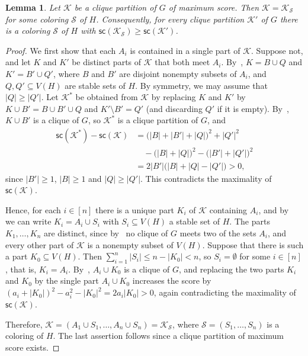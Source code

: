 \documentclass[a4paper,fleqn]{cas-sc}
\newtheorem{lem}[thm]{Lemma}
\theoremstyle{remark}
\theoremstyle{plain}
\newcommand{\score}{{\mathsf{sc}}}
\begin{document}
\begin{lem} \label{lem:structure}
    Let $\mathcal{K}$ be a clique partition of $G$ of maximum score.  Then $\mathcal{K}=\mathcal{K}_{\mathcal{S}}$ for some coloring $\mathcal{S}$ of $H$.  Consequently, for every clique partition $\mathcal{K}'$ of $G$ there is a coloring $\mathcal{S}$ of $H$ with $\score(\mathcal{K}_{\mathcal{S}}) \geq \score(\mathcal{K}')$.
\end{lem}

\begin{proof}
    We first show that each $A_i$ is contained in a single part of $\mathcal{K}$.  Suppose not, and let $K$ and $K'$ be distinct parts of $\mathcal{K}$ that both meet $A_i$.  By~, $K = B \cup Q$ and $K'=B' \cup Q'$, where $B$ and $B'$ are disjoint nonempty subsets of $A_i$, and $Q, Q' \subseteq V(H)$ are stable sets of $H$.  By symmetry, we may assume that $|Q| \geq |Q'|$.  Let $\mathcal{K}^*$ be obtained from $\mathcal{K}$ by replacing $K$ and $K'$ by $K \cup B' = B \cup B' \cup Q$ and $K' \setminus B' = Q'$ (and discarding $Q'$ if it is empty).  By~, $K \cup B'$ is a clique of $G$, so $\mathcal{K}^*$ is a clique partition of $G$, and
    \begin{align*}
        \score(\mathcal{K}^*) - \score(\mathcal{K})
        &= \bigl(|B|+|B'|+|Q|\bigr)^2 + |Q'|^2 \\
        &\quad - \bigl(|B|+|Q|\bigr)^2 - \bigl(|B'|+|Q'|\bigr)^2 \\
        &= 2|B'|\bigl(|B| + |Q| - |Q'|\bigr) > 0,
    \end{align*}
    since $|B'| \geq 1$, $|B| \geq 1$ and $|Q| \geq |Q'|$.  This contradicts the maximality of $\score(\mathcal{K})$.

    Hence, for each $i \in [n]$ there is a unique part $K_i$ of $\mathcal{K}$ containing $A_i$, and by~ we can write $K_i = A_i \cup S_i$ with $S_i \subseteq V(H)$ a stable set of $H$.  The parts $K_1, \dots, K_n$ are distinct, since by~ no clique of $G$ meets two of the sets $A_i$, and every other part of $\mathcal{K}$ is a nonempty subset of $V(H)$.  Suppose that there is such a part $K_0 \subseteq V(H)$.  Then $\sum_{i=1}^n |S_i| \leq n - |K_0| < n$, so $S_i = \emptyset$ for some $i \in [n]$, that is, $K_i = A_i$.  By~, $A_i \cup K_0$ is a clique of $G$, and replacing the two parts $K_i$ and $K_0$ by the single part $A_i \cup K_0$ increases the score by $(a_i+|K_0|)^2 - a_i^2 - |K_0|^2 = 2a_i|K_0| > 0$, again contradicting the maximality of $\score(\mathcal{K})$.

    Therefore, $\mathcal{K} = (A_1 \cup S_1, \dots, A_n \cup S_n) = \mathcal{K}_{\mathcal{S}}$, where $\mathcal{S}=(S_1, \dots, S_n)$ is a coloring of $H$.  The last assertion follows since a clique partition of maximum score exists.
\end{proof}
\end{document}

